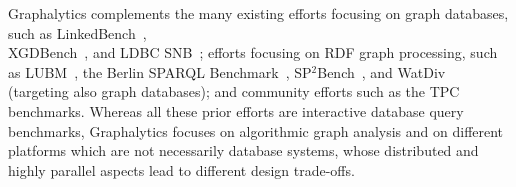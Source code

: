 Graphalytics complements the many existing efforts focusing on graph databases, such as 
LinkedBench~\cite{DBLP:conf/sigmod/ArmstrongPBC13}, 
\\XGDBench~\cite{DBLP:journals/ase/DayarathnaS14}, and 
LDBC SNB~\cite{DBLP:conf/sigmod/ErlingALCGPPB15};  
efforts focusing on RDF graph processing, such as 
LUBM~\cite{DBLP:journals/ws/GuoPH05},
the Berlin {SPARQL} Benchmark~\cite{DBLP:journals/ijswis/BizerS09},
SP$^2$Bench~\cite{DBLP:conf/icde/SchmidtHLP09},
and WatDiv~\cite{DBLP:conf/semweb/AlucHOD14} (targeting also graph databases);
and community efforts such as the TPC benchmarks.
Whereas all these prior efforts are interactive database query benchmarks, Graphalytics focuses on algorithmic graph analysis and on different platforms which are not necessarily database systems, whose distributed and highly parallel aspects lead to different design trade-offs.



